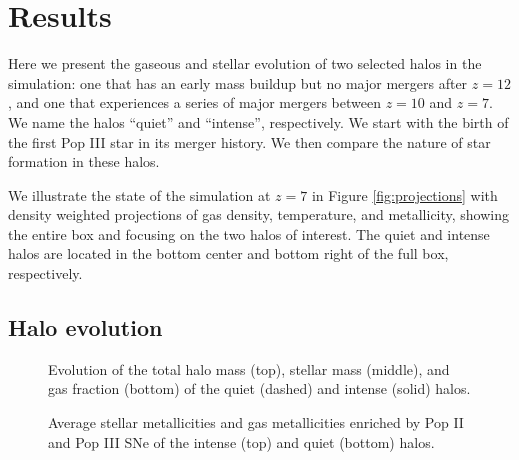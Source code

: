 \documentclass[apjl]{emulateapj}
\begin{document}
\section{Results}
\label{sec:results}

\begin{figure*}
  \caption{\label{fig:projections} Density-weighted projections of gas
    density (top), temperature (middle), and metallicity (bottom).
    The left column shows the entire simulation volume, where the
    center and right columns focus on the intense and quiet halos,
    respectively.  The metallicity projections are a composite picture
    of metals originating from Pop III (red) and Pop II (blue) stars.}
\end{figure*}

Here we present the gaseous and stellar evolution of two selected
halos in the simulation: one that has an early mass buildup but no
major mergers after $z=12$, and one that experiences a series of major
mergers between $z=10$ and $z=7$.  We name the halos ``quiet'' and
``intense'', respectively.  We start with the birth of the first Pop
III star in its merger history.  We then compare the nature of star
formation in these halos.

We illustrate the state of the simulation at $z=7$ in Figure
\ref{fig:projections} with density weighted projections of gas
density, temperature, and metallicity, showing the entire box and
focusing on the two halos of interest.  The quiet and intense halos
are located in the bottom center and bottom right of the full box,
respectively.

\subsection{Halo evolution}

\begin{figure}
  \caption{\label{fig:evo} Evolution of the total halo mass (top),
    stellar mass (middle), and gas fraction (bottom) of the quiet
    (dashed) and intense (solid) halos.}
\end{figure}

\begin{figure}
  \caption{\label{fig:Zevo} Average stellar metallicities and gas
    metallicities enriched by Pop II and Pop III SNe of the
    intense (top) and quiet (bottom) halos.}
\end{figure}
\end{document}
